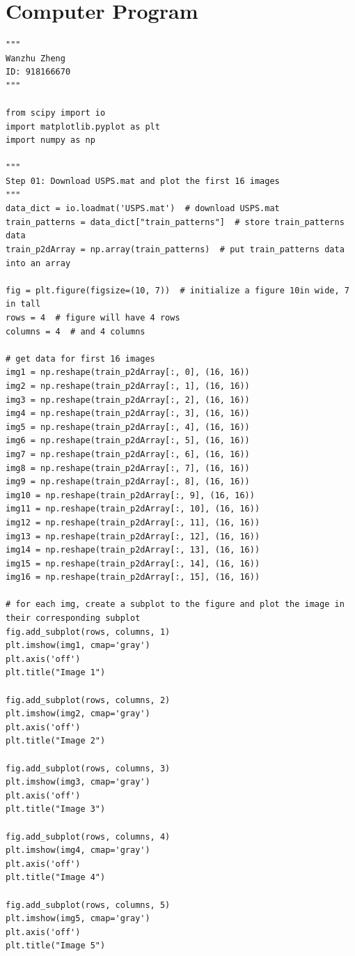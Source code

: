 \documentclass{article} %
\begin{document}
  \section{Computer Program}
    \begin{verbatim}
"""
Wanzhu Zheng
ID: 918166670
"""

from scipy import io
import matplotlib.pyplot as plt
import numpy as np

"""
Step 01: Download USPS.mat and plot the first 16 images
"""
data_dict = io.loadmat('USPS.mat')  # download USPS.mat
train_patterns = data_dict["train_patterns"]  # store train_patterns data
train_p2dArray = np.array(train_patterns)  # put train_patterns data into an array

fig = plt.figure(figsize=(10, 7))  # initialize a figure 10in wide, 7 in tall
rows = 4  # figure will have 4 rows
columns = 4  # and 4 columns

# get data for first 16 images
img1 = np.reshape(train_p2dArray[:, 0], (16, 16))
img2 = np.reshape(train_p2dArray[:, 1], (16, 16))
img3 = np.reshape(train_p2dArray[:, 2], (16, 16))
img4 = np.reshape(train_p2dArray[:, 3], (16, 16))
img5 = np.reshape(train_p2dArray[:, 4], (16, 16))
img6 = np.reshape(train_p2dArray[:, 5], (16, 16))
img7 = np.reshape(train_p2dArray[:, 6], (16, 16))
img8 = np.reshape(train_p2dArray[:, 7], (16, 16))
img9 = np.reshape(train_p2dArray[:, 8], (16, 16))
img10 = np.reshape(train_p2dArray[:, 9], (16, 16))
img11 = np.reshape(train_p2dArray[:, 10], (16, 16))
img12 = np.reshape(train_p2dArray[:, 11], (16, 16))
img13 = np.reshape(train_p2dArray[:, 12], (16, 16))
img14 = np.reshape(train_p2dArray[:, 13], (16, 16))
img15 = np.reshape(train_p2dArray[:, 14], (16, 16))
img16 = np.reshape(train_p2dArray[:, 15], (16, 16))

# for each img, create a subplot to the figure and plot the image in their corresponding subplot
fig.add_subplot(rows, columns, 1)
plt.imshow(img1, cmap='gray')
plt.axis('off')
plt.title("Image 1")

fig.add_subplot(rows, columns, 2)
plt.imshow(img2, cmap='gray')
plt.axis('off')
plt.title("Image 2")

fig.add_subplot(rows, columns, 3)
plt.imshow(img3, cmap='gray')
plt.axis('off')
plt.title("Image 3")

fig.add_subplot(rows, columns, 4)
plt.imshow(img4, cmap='gray')
plt.axis('off')
plt.title("Image 4")

fig.add_subplot(rows, columns, 5)
plt.imshow(img5, cmap='gray')
plt.axis('off')
plt.title("Image 5")


\end{verbatim}
\end{document}
